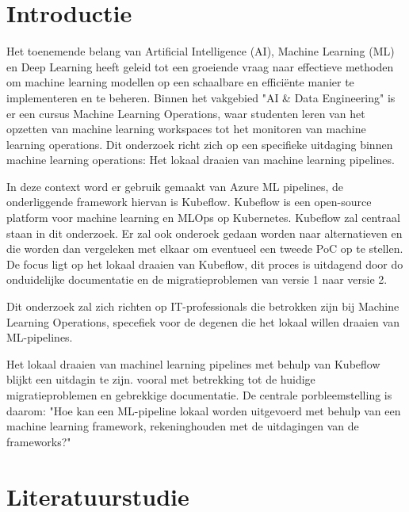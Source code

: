 
\section{Introductie}%
\label{sec:introductie}

Het toenemende belang van Artificial Intelligence (AI), Machine Learning (ML) en Deep Learning heeft geleid tot een groeiende vraag naar effectieve methoden om machine learning modellen op een schaalbare en efficiënte manier te implementeren en te beheren.
Binnen het vakgebied "AI \& Data Engineering" is er een cursus Machine Learning Operations, waar studenten leren van het opzetten van machine learning workspaces tot het monitoren van machine learning operations.
Dit onderzoek richt zich op een specifieke uitdaging binnen machine learning operations: Het lokaal draaien van machine learning pipelines.

In deze context word er gebruik gemaakt van Azure ML pipelines, de onderliggende framework hiervan is Kubeflow. Kubeflow is een open-source platform voor machine learning en MLOps op Kubernetes. Kubeflow zal centraal staan in dit onderzoek. %
Er zal ook onderoek gedaan worden naar alternatieven en die worden dan vergeleken met elkaar om eventueel een tweede PoC op te stellen.
De focus ligt op het lokaal draaien van Kubeflow, dit proces is uitdagend door do onduidelijke documentatie en de migratieproblemen van versie 1 naar versie 2.

Dit onderzoek zal zich richten op IT-professionals die betrokken zijn bij Machine Learning Operations, specefiek voor de degenen die het lokaal willen draaien van ML-pipelines.

Het lokaal draaien van machinel learning pipelines met behulp van Kubeflow blijkt een uitdagin te zijn. vooral met betrekking tot de huidige migratieproblemen en gebrekkige documentatie.
De centrale porbleemstelling is daarom: "Hoe kan een ML-pipeline lokaal worden uitgevoerd met behulp van een machine learning framework, rekeninghouden met de uitdagingen van de frameworks?"





\section{Literatuurstudie}%
\label{sec:state-of-the-art}


